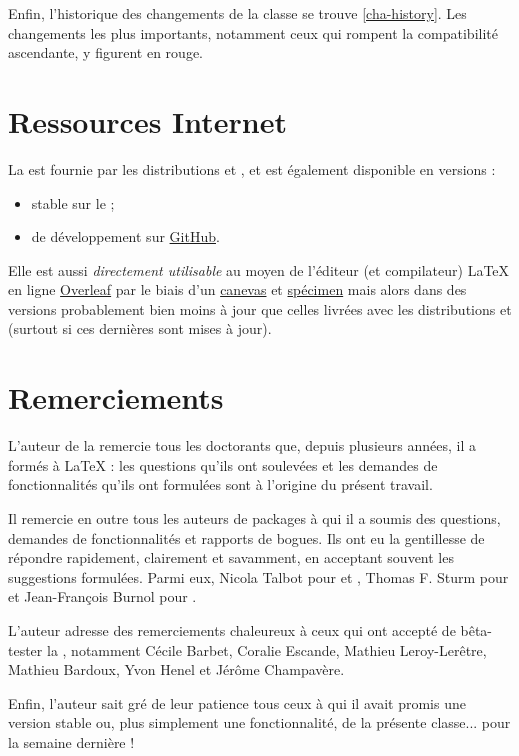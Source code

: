 Enfin, l'historique des changements de la classe se trouve \vref{cha-history}.
Les changements les plus importants, notamment ceux qui rompent la compatibilité
ascendante, y figurent en rouge.

\section{Ressources Internet}
\label{sec-ressources-internet}
%

La \yatCl{} est fournie par les distributions \texlive{} et \miktex{}, et est
également disponible en versions :
\begin{itemize}
\item stable sur le \href{https://ctan.org/pkg/yathesis}{} ;
\item de développement sur \href{https://github.com/dbitouze/yathesis}{GitHub}.
\end{itemize}

Elle est aussi \emph{directement utilisable} au moyen de l'éditeur (et compilateur)
\LaTeX{} en ligne%
%
%
%
%
\href{https://www.overleaf.com/}{Overleaf} par le biais d'un
\href{https://www.overleaf.com/read/hsgnfrkzcmbh}{canevas} et
\href{https://www.overleaf.com/read/fsmqshrkdvgj}{spécimen}\detailsspecimencanevas{}
mais alors dans des versions probablement bien moins à jour que celles livrées
avec les distributions \texlive{} et \miktex{} (surtout si ces dernières sont
mises à jour).

\section{Remerciements}
\label{sec-remerciements}

L'auteur de la \yatCl{} remercie tous les doctorants que, depuis plusieurs
années, il a formés à \LaTeX{} : les questions qu'ils ont soulevées et les
demandes de fonctionnalités qu'ils ont formulées sont à l'origine du présent
travail.

Il remercie en outre tous les auteurs de packages à qui il a soumis  des questions, demandes de fonctionnalités et rapports
de bogues. Ils ont eu la gentillesse de répondre rapidement, clairement et
savamment, en acceptant souvent les suggestions formulées. Parmi eux, Nicola
Talbot pour  et , Thomas F. Sturm
pour  et Jean-François Burnol pour .

L'auteur adresse des remerciements chaleureux à ceux qui ont accepté de
bêta-tester la \yatCl{}, notamment Cécile Barbet, Coralie Escande, Mathieu
Leroy-Lerêtre, Mathieu Bardoux, Yvon Henel et Jérôme Champavère.

Enfin, l'auteur sait gré de leur patience tous ceux à qui il avait promis une
version stable ou, plus simplement une fonctionnalité, de la présente
classe... pour la semaine dernière !


